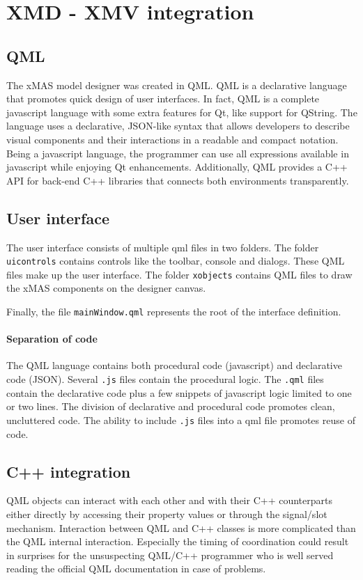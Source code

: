 \section{XMD - XMV integration}

\subsection{QML}

The xMAS model designer was created in QML. QML is a declarative language
that promotes quick design of user interfaces. In fact, QML is a complete javascript language
with some extra features for Qt, like support for {\sc QString}. 
The language uses a declarative, JSON-like syntax that allows developers to describe 
visual components and their interactions in a readable and compact notation. Being 
a javascript language, the programmer can use all expressions available
in javascript while enjoying Qt enhancements. 
Additionally, QML provides a C++ API for back-end C++ libraries that connects both environments
transparently.

\subsection{User interface}

The user interface consists of multiple qml files in two folders.
The folder {\tt uicontrols} contains controls like the toolbar, 
console and dialogs. These QML files make up the user interface. 
The folder {\tt xobjects} contains QML files to draw the 
xMAS components on the designer canvas. 

Finally, the file {\tt mainWindow.qml} represents the root of the interface definition.

\paragraph{Separation of code}
The QML language contains both procedural code (javascript) and declarative code (JSON).
Several {\tt .js} files contain the procedural logic. The {\tt .qml} files contain
the declarative code plus a few snippets of javascript logic limited to one or two lines. 
The division of declarative and procedural code promotes clean, uncluttered code. 
The ability to include {\tt .js} files into a qml file promotes reuse of code.

\subsection{C++ integration}
QML objects can interact with each other and with their C++ counterparts 
either directly by accessing their property values or through the signal/slot mechanism. 
Interaction between QML and C++ classes is more complicated than the QML internal
interaction. Especially the timing of coordination could result in surprises for
the unsuspecting QML/C++ programmer who is well served reading the official QML documentation
in case of problems. 

